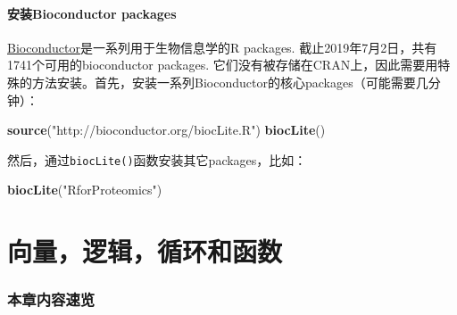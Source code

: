 \documentclass[]{book}
\newenvironment{Shaded}{\begin{snugshade}}{\end{snugshade}}
\newcommand{\KeywordTok}[1]{\textcolor[rgb]{0.13,0.29,0.53}{\textbf{#1}}}
\newcommand{\NormalTok}[1]{#1}
\newcommand{\StringTok}[1]{\textcolor[rgb]{0.31,0.60,0.02}{#1}}
\begin{document}
\hypertarget{Bioconductor}{%
\subsubsection{安装Bioconductor packages}\label{Bioconductor}}

\href{https://bioconductor.org}{Bioconductor}是一系列用于生物信息学的R packages. 截止2019年7月2日，共有1741个可用的bioconductor packages. 它们没有被存储在CRAN上，因此需要用特殊的方法安装。首先，安装一系列Bioconductor的核心packages（可能需要几分钟）：

\begin{Shaded}
\begin{Highlighting}[]
\KeywordTok{source}\NormalTok{(}\StringTok{"http://bioconductor.org/biocLite.R"}\NormalTok{)}
\KeywordTok{biocLite}\NormalTok{()}
\end{Highlighting}
\end{Shaded}

然后，通过\texttt{biocLite()}函数安装其它packages，比如：

\begin{Shaded}
\begin{Highlighting}[]
\KeywordTok{biocLite}\NormalTok{(}\StringTok{"RforProteomics"}\NormalTok{)}
\end{Highlighting}
\end{Shaded}

\hypertarget{vectors-logicals-and-functions}{%
\chapter{向量，逻辑，循环和函数}\label{vectors-logicals-and-functions}}

\hypertarget{intro-overview-vector}{%
\subsection*{本章内容速览}\label{intro-overview-vector}}
\end{document}
